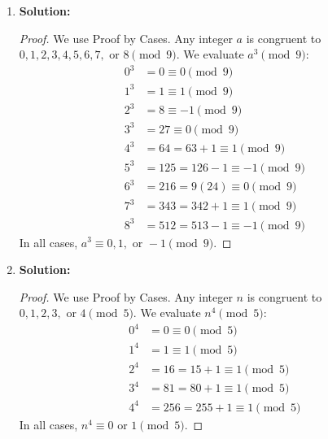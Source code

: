 \documentclass{article}
\begin{document}
\begin{enumerate}
    \item \textbf{Solution:}
    \begin{proof}
        We use Proof by Cases. Any integer $a$ is congruent to $0, 1, 2, 3, 4, 5, 6, 7, \text{ or } 8 \pmod 9$. We evaluate $a^3 \pmod 9$:
        \begin{align*}
            0^3 &= 0 \equiv 0 \pmod 9 \\
            1^3 &= 1 \equiv 1 \pmod 9 \\
            2^3 &= 8 \equiv -1 \pmod 9 \\
            3^3 &= 27 \equiv 0 \pmod 9 \\
            4^3 &= 64 = 63 + 1 \equiv 1 \pmod 9 \\
            5^3 &= 125 = 126 - 1 \equiv -1 \pmod 9 \\
            6^3 &= 216 = 9(24) \equiv 0 \pmod 9 \\
            7^3 &= 343 = 342 + 1 \equiv 1 \pmod 9 \\
            8^3 &= 512 = 513 - 1 \equiv -1 \pmod 9
        \end{align*}
        In all cases, $a^3 \equiv 0, 1, \text{ or } -1 \pmod 9$.
    \end{proof}

    \item \textbf{Solution:}
    \begin{proof}
        We use Proof by Cases. Any integer $n$ is congruent to $0, 1, 2, 3, \text{ or } 4 \pmod 5$. We evaluate $n^4 \pmod 5$:
        \begin{align*}
            0^4 &= 0 \equiv 0 \pmod 5 \\
            1^4 &= 1 \equiv 1 \pmod 5 \\
            2^4 &= 16 = 15 + 1 \equiv 1 \pmod 5 \\
            3^4 &= 81 = 80 + 1 \equiv 1 \pmod 5 \\
            4^4 &= 256 = 255 + 1 \equiv 1 \pmod 5
        \end{align*}
        In all cases, $n^4 \equiv 0 \text{ or } 1 \pmod 5$.
    \end{proof}


\end{enumerate}
\end{document}
